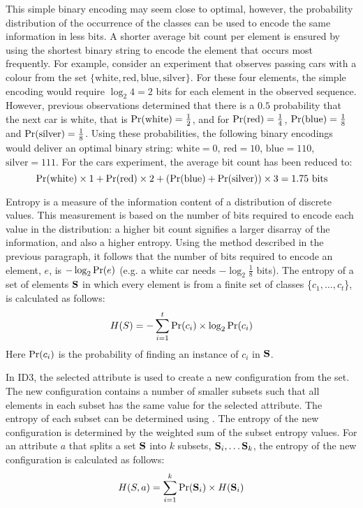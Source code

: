 This simple binary encoding may seem close to optimal, however, the probability distribution of the occurrence of the classes can be used to encode the same information in less bits. A shorter average bit count per element is ensured by using the shortest binary string to encode the element that occurs most frequently. For example, consider an experiment that observes passing cars with a colour from the set  $\{\mbox{white},\mbox{red},\mbox{blue},\mbox{silver}\}$.  For these four elements, the simple encoding would require $\log_2{4} = 2$ bits for each element in the observed sequence. However, previous observations determined that there is a $0.5$ probability that the next car is white, that is $\mbox{Pr}(\mbox{white}) = \frac{1}{2}$, and for $\mbox{Pr}(\mbox{red}) = \frac{1}{4}$, $\mbox{Pr}(\mbox{blue}) = \frac{1}{8}$ and $\mbox{Pr}(\mbox{silver}) = \frac{1}{8}$. Using these probabilities, the following binary encodings would deliver an optimal binary string: $\mbox{white} = 0$, $\mbox{red}=10$, $\mbox{blue}=110$, $\mbox{silver}=111$.   For the cars experiment, the average bit count has been reduced to:
\[
	\mbox{Pr}(\mbox{white}) \times 1 + 
	\mbox{Pr}(\mbox{red}) \times 2 + 
	(\mbox{Pr}(\mbox{blue}) + \mbox{Pr}(\mbox{silver})) \times 3 = 1.75 \mbox{ bits}
\] 

Entropy is a measure of the information content of a distribution of discrete values. This measurement is based on the number of bits required to encode each value in the distribution: a higher bit count signifies a larger disarray of the information, and also a higher entropy.  Using the method described in the previous paragraph, it follows that the number of bits required to encode an element, $e$, is $-\log_2{\mbox{Pr}(e)}$ (e.g. a white car needs $-\log_2{\frac{1}{8}}$ bits). The entropy of a set of elements ${\bf S}$ in which every element is from a finite set of classes \{$c_1, \ldots, c_t$\}, is calculated as follows:
\begin{equation}
H(S) = - \sum_{i=1}^{t}{\mbox{Pr}(c_i) \times  \log_2{\mbox{Pr}(c_i)}}
\label{eq:entropy}
\end{equation}
Here $\mbox{Pr}(c_i)$ is the probability of finding an instance of $c_i$ in ${\bf S}$.  

In ID3, the selected attribute is used to create a new configuration from the set.  The new configuration contains a number of smaller subsets such that all elements in each subset has the same value for the selected attribute. The entropy of each subset can be determined using .  The entropy of the new configuration is determined by the weighted sum of the subset entropy values. For an attribute $a$ that splits a set ${\bf S}$ into $k$ subsets, ${\bf S}_i, \ldots {\bf S}_k$, the entropy of the new configuration is calculated as follows:
\begin{equation}
H(S,a) = \sum_{i=1}^{k}{\mbox{Pr}({\bf S}_i) \times H({\bf S}_i)}
\label{eq:attrib_entropy}
\end{equation}

